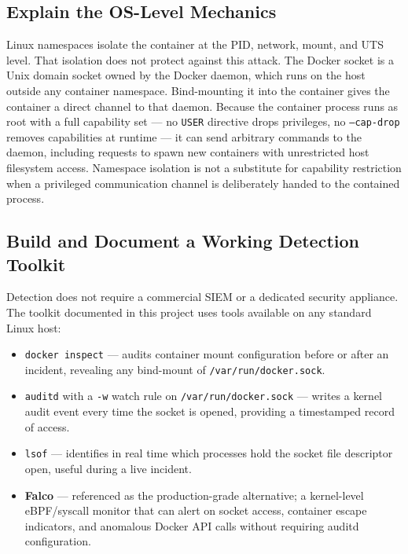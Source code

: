 \subsection{Explain the OS-Level Mechanics}

Linux namespaces isolate the container at the PID, network, mount, and UTS
level. That isolation does not protect against this attack. The Docker socket is
a Unix domain socket owned by the Docker daemon, which runs on the host outside
any container namespace. Bind-mounting it into the container gives the container
a direct channel to that daemon. Because the container process runs as root with
a full capability set --- no \texttt{USER} directive drops privileges, no
\texttt{--cap-drop} removes capabilities at runtime --- it can send arbitrary
commands to the daemon, including requests to spawn new containers with
unrestricted host filesystem access. Namespace isolation is not a substitute for
capability restriction when a privileged communication channel is deliberately
handed to the contained process.

\subsection{Build and Document a Working Detection Toolkit}

Detection does not require a commercial SIEM or a dedicated security appliance.
The toolkit documented in this project uses tools available on any standard
Linux host:

\begin{itemize}
  \item \texttt{docker inspect} --- audits container mount configuration before
    or after an incident, revealing any bind-mount of
    \texttt{/var/run/docker.sock}.
  \item \texttt{auditd} with a \texttt{-w} watch rule on
    \texttt{/var/run/docker.sock} --- writes a kernel audit event every time the
    socket is opened, providing a timestamped record of access.
  \item \texttt{lsof} --- identifies in real time which processes hold the
    socket file descriptor open, useful during a live incident.
  \item \textbf{Falco} --- referenced as the production-grade alternative; a
    kernel-level eBPF/syscall monitor that can alert on socket access, container
    escape indicators, and anomalous Docker API calls without requiring auditd
    configuration.
\end{itemize}

